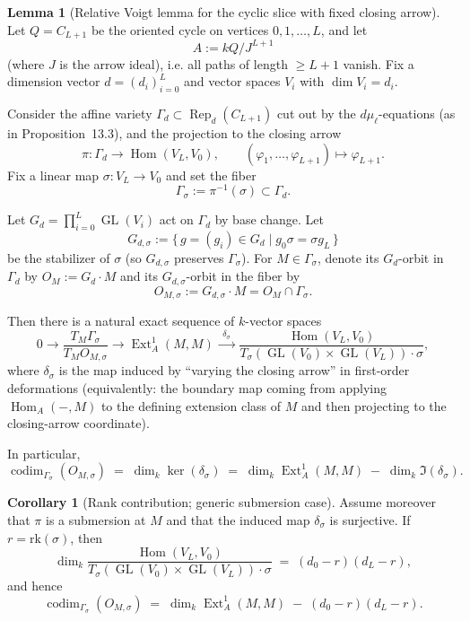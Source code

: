 \documentclass{article}
\newcommand{\Hom}{\operatorname{Hom}}
\newcommand{\Rep}{\operatorname{Rep}}
\newcommand{\codim}{\operatorname{codim}}
\newcommand{\Ext}{\operatorname{Ext}}
\newcommand{\GL}{\operatorname{GL}}
\theoremstyle{definition}
\newtheorem{lemma}[theorem]{Lemma}
\newtheorem{corollary}[theorem]{Corollary}
\begin{document}
\begin{lemma}[Relative Voigt lemma for the cyclic slice with fixed closing arrow]
\label{lem:relative_voigt_fixed_sigma}
Let $Q=C_{L+1}$ be the oriented cycle on vertices $0,1,\dots,L$, and let
\[
A := kQ/J^{L+1}
\]
(where $J$ is the arrow ideal), i.e. all paths of length $\ge L+1$ vanish.
Fix a dimension vector $d=(d_i)_{i=0}^L$ and vector spaces $V_i$ with $\dim V_i=d_i$.

Consider the affine variety $\Gamma_d\subset \Rep_d(C_{L+1})$ cut out by the $d\mu_\ell$-equations
(as in Proposition~13.3), and the projection to the closing arrow
\[
\pi:\Gamma_d \longrightarrow \Hom(V_L,V_0),\qquad
(\varphi_1,\dots,\varphi_{L+1})\longmapsto \varphi_{L+1}.
\]
Fix a linear map $\sigma:V_L\to V_0$ and set the fiber
\[
\Gamma_\sigma := \pi^{-1}(\sigma)\subset \Gamma_d.
\]

Let $G_d=\prod_{i=0}^L \GL(V_i)$ act on $\Gamma_d$ by base change.
Let
\[
G_{d,\sigma} := \{\, g=(g_i)\in G_d \mid g_0 \sigma = \sigma g_L \,\}
\]
be the stabilizer of $\sigma$ (so $G_{d,\sigma}$ preserves $\Gamma_\sigma$).
For $M\in \Gamma_\sigma$, denote its $G_d$-orbit in $\Gamma_d$ by $O_M:=G_d\cdot M$
and its $G_{d,\sigma}$-orbit in the fiber by
\[
O_{M,\sigma}:=G_{d,\sigma}\cdot M = O_M\cap \Gamma_\sigma.
\]

Then there is a natural exact sequence of $k$-vector spaces
\[
0 \longrightarrow
\frac{T_M\Gamma_\sigma}{T_M O_{M,\sigma}}
\longrightarrow
\Ext^1_A(M,M)
\overset{\;\;\delta_\sigma\;\;}{\longrightarrow}
\frac{\Hom(V_L,V_0)}{T_\sigma(\GL(V_0)\times \GL(V_L))\cdot \sigma},
\]
where $\delta_\sigma$ is the map induced by “varying the closing arrow” in first-order
deformations (equivalently: the boundary map coming from applying $\Hom_A(-,M)$
to the defining extension class of $M$ and then projecting to the closing-arrow coordinate).

In particular,
\[
\codim_{\Gamma_\sigma}(O_{M,\sigma})
\;=\;
\dim_k \ker(\delta_\sigma)
\;=\;
\dim_k \Ext^1_A(M,M) \;-\; \dim_k \Im(\delta_\sigma).
\]
\end{lemma}

\begin{corollary}[Rank contribution; generic submersion case]
\label{cor:rank_correction}
Assume moreover that $\pi$ is a submersion at $M$ and that the induced map
$\delta_\sigma$ is surjective. If $r=\text{rk}(\sigma)$, then
\[
\dim_k \frac{\Hom(V_L,V_0)}{T_\sigma(\GL(V_0)\times \GL(V_L))\cdot \sigma}
\;=\;
(d_0-r)(d_L-r),
\]
and hence
\[
\codim_{\Gamma_\sigma}(O_{M,\sigma})
\;=\;
\dim_k \Ext^1_A(M,M) \;-\; (d_0-r)(d_L-r).
\]
\end{corollary}
\end{document}
